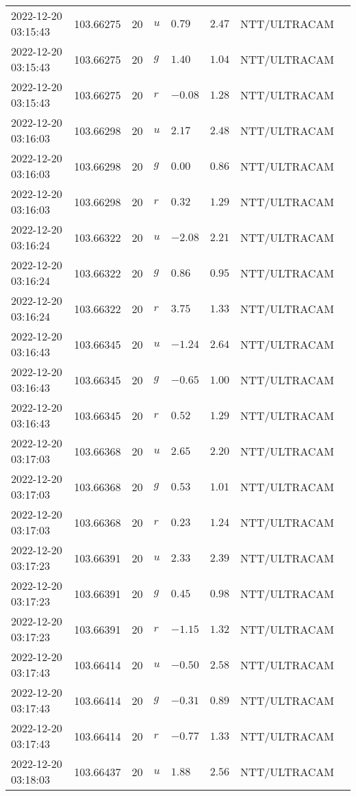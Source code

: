 \documentclass{nature_plusfigure}
\begin{document}
\begin{supplement}
\begin{center}
\begin{longtable}{llllllll}
2022-12-20 03:15:43 & 103.66275 & 20 & $u$ & $0.79$ & $2.47$ & NTT/ULTRACAM &  \\ 
2022-12-20 03:15:43 & 103.66275 & 20 & $g$ & $1.40$ & $1.04$ & NTT/ULTRACAM &  \\ 
2022-12-20 03:15:43 & 103.66275 & 20 & $r$ & $-0.08$ & $1.28$ & NTT/ULTRACAM &  \\ 
2022-12-20 03:16:03 & 103.66298 & 20 & $u$ & $2.17$ & $2.48$ & NTT/ULTRACAM &  \\ 
2022-12-20 03:16:03 & 103.66298 & 20 & $g$ & $0.00$ & $0.86$ & NTT/ULTRACAM &  \\ 
2022-12-20 03:16:03 & 103.66298 & 20 & $r$ & $0.32$ & $1.29$ & NTT/ULTRACAM &  \\ 
2022-12-20 03:16:24 & 103.66322 & 20 & $u$ & $-2.08$ & $2.21$ & NTT/ULTRACAM &  \\ 
2022-12-20 03:16:24 & 103.66322 & 20 & $g$ & $0.86$ & $0.95$ & NTT/ULTRACAM &  \\ 
2022-12-20 03:16:24 & 103.66322 & 20 & $r$ & $3.75$ & $1.33$ & NTT/ULTRACAM &  \\ 
2022-12-20 03:16:43 & 103.66345 & 20 & $u$ & $-1.24$ & $2.64$ & NTT/ULTRACAM &  \\ 
2022-12-20 03:16:43 & 103.66345 & 20 & $g$ & $-0.65$ & $1.00$ & NTT/ULTRACAM &  \\ 
2022-12-20 03:16:43 & 103.66345 & 20 & $r$ & $0.52$ & $1.29$ & NTT/ULTRACAM &  \\ 
2022-12-20 03:17:03 & 103.66368 & 20 & $u$ & $2.65$ & $2.20$ & NTT/ULTRACAM &  \\ 
2022-12-20 03:17:03 & 103.66368 & 20 & $g$ & $0.53$ & $1.01$ & NTT/ULTRACAM &  \\ 
2022-12-20 03:17:03 & 103.66368 & 20 & $r$ & $0.23$ & $1.24$ & NTT/ULTRACAM &  \\ 
2022-12-20 03:17:23 & 103.66391 & 20 & $u$ & $2.33$ & $2.39$ & NTT/ULTRACAM &  \\ 
2022-12-20 03:17:23 & 103.66391 & 20 & $g$ & $0.45$ & $0.98$ & NTT/ULTRACAM &  \\ 
2022-12-20 03:17:23 & 103.66391 & 20 & $r$ & $-1.15$ & $1.32$ & NTT/ULTRACAM &  \\ 
2022-12-20 03:17:43 & 103.66414 & 20 & $u$ & $-0.50$ & $2.58$ & NTT/ULTRACAM &  \\ 
2022-12-20 03:17:43 & 103.66414 & 20 & $g$ & $-0.31$ & $0.89$ & NTT/ULTRACAM &  \\ 
2022-12-20 03:17:43 & 103.66414 & 20 & $r$ & $-0.77$ & $1.33$ & NTT/ULTRACAM &  \\ 
2022-12-20 03:18:03 & 103.66437 & 20 & $u$ & $1.88$ & $2.56$ & NTT/ULTRACAM &  \\ 

\end{longtable}
\end{center}
\end{supplement}
\end{document}
